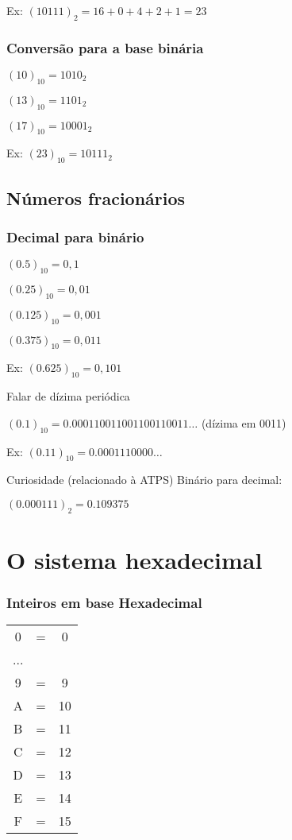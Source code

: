 \documentclass[a4paper]{article}
\begin{document}
Ex: $(10111)_2 = 16 + 0 + 4 + 2 +1 = 23$

\subsubsection*{Conversão para a base binária}

$(10)_{10} = 1010_2$

$(13)_{10} = 1101_2$

$(17)_{10} = 10001_2$

Ex: $(23)_{10} = 10111_2$

\subsection*{Números fracionários}
\subsubsection*{Decimal para binário}

$(0.5)_{10} = 0,1$

$(0.25)_{10} = 0,01$

$(0.125)_{10} = 0,001$

$(0.375)_{10} = 0,011$

Ex: $(0.625)_{10} = 0,101$
 
Falar de dízima periódica 

$(0.1)_{10} = 0.000110011001100110011\ldots$ (dízima em 0011) 
 
Ex: $(0.11)_{10} = 0.0001110000\ldots$
 
Curiosidade (relacionado à ATPS) Binário para decimal: 

$(0.000111)_2 = 0.109375$

\section*{O sistema hexadecimal}

\subsubsection*{Inteiros em base Hexadecimal}

\begin{tabular}{ccc}
  0 &=& 0\\
  ...\\
  9 &=& 9\\
  A &=& 10\\
  B &=& 11\\
  C &=& 12\\
  D &=& 13\\
  E &=& 14\\
  F &=& 15\\
\end{tabular}
\end{document}
